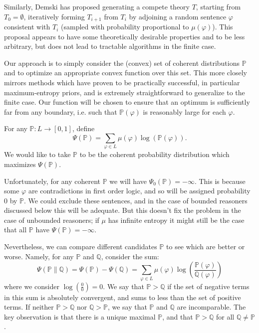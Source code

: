 \documentclass[12pt]{article}
\theoremstyle{definition}
\newcommand{\QQ}{\mathbb{Q}}
\newcommand{\Q}[1]{\QQ\of{#1}}
\newcommand{\of}[1]{\left(#1\right)}
\newcommand{\ofcc}[2]{\left(#1\middle\| #2\right)}
\newcommand{\PP}{\mathbb{P}}
\newcommand{\muv}{\mu\of{\vp}}
\renewcommand{\P}[1]{\mathbb{P}\of{#1}}
\newcommand{\vp}{\varphi}
\newcommand{\reg}[1]{\Psi\of{#1}}
\newcommand{\regpre}[1]{\Psi_0\of{#1}}
\newcommand{\relreg}[2]{\Psi\ofcc{#1}{#2}}
\begin{document}
Similarly, Demski has proposed generating a compete theory $T$,
starting from $T_0 = \emptyset$,
iteratively forming $T_{i+1}$ from $T_i$
by adjoining a random sentence $\vp$ consistent with $T_i$
(sampled with probability proportional to $\muv$).
This proposal appears to have some theoretically desirable properties
and to be less arbitrary,
but does not lead to tractable algorithms in the finite case.

Our approach is to simply consider the (convex)
set of coherent distributions $\PP$
and to optimize an appropriate convex function over this set.
This more closely mirrors methods which have proven
to be practically successful, in particular maximum-entropy priors,
and is extremely straightforward to generalize to the finite case.
Our function will be chosen to ensure that an optimum is
sufficiently far from any boundary,
i.e. such that $\P{\vp}$ is reasonably large for each $\vp$.

For any $\PP : L \rightarrow [0, 1]$, define
\[\reg{\PP} = \sum_{\vp \in L} \mu\of{\vp} \log\of{\P{\vp}}.\]
We would like to take $\PP$ to be the coherent probability
distribution which maximizes $\reg{\PP}$.

Unfortunately, for any coherent $\PP$ we will have $\regpre{\PP} = - \infty$.
This is because some $\vp$ are contradictions in first order logic,
and so will be assigned probability $0$ by $\PP$.
We could exclude these sentences, 
and in the case of bounded reasoners discussed below this will be adequate.
But this doesn't fix the problem
in the case of unbounded reasoners;
if $\mu$ has infinite entropy it might still be the case that all $\PP$
have $\reg{\PP} = - \infty$.

Nevertheless, we can compare different candidates $\PP$ to see which are better or worse.
Namely, for any $\PP$ and $\QQ$, consider the sum:
\[ \relreg{\PP}{\QQ} 
= \reg{\PP} - \reg{\QQ} = \sum_{\vp \in L} \mu\of{\vp} \log\of{\frac{\P{\vp}}{\Q{\vp}}} \]
where we consider $\log\of{\frac 00} = 0$.
We say that $\PP > \QQ$ if the set of negative terms
in this sum is absolutely convergent,
and sums to less than the set of positive terms.
If neither $\PP > \QQ$ nor $\QQ > \PP$,
we say that $\PP$ and $\QQ$ are incomparable.
The key observation is that there is a unique maximal $\PP$,
and that $\PP > \QQ$ for all $\QQ \neq \PP$.
\end{document}
